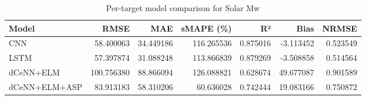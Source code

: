 \begin{table}
\caption{Per-target model comparison for Solar Mw}
\begin{tabular}{lrrrrrr}
\toprule
Model & RMSE & MAE & sMAPE (\%) & R² & Bias & NRMSE \\
\midrule
CNN & 58.400063 & 34.449186 & 116.265536 & 0.875016 & -3.113452 & 0.523549 \\
LSTM & 57.397874 & 31.088248 & 113.866839 & 0.879269 & -3.508858 & 0.514564 \\
dCeNN+ELM & 100.756380 & 88.866094 & 126.088821 & 0.628674 & 49.677087 & 0.901589 \\
dCeNN+ELM+ASP & 83.913183 & 58.310206 & 60.636028 & 0.742444 & 19.083166 & 0.750872 \\
\bottomrule
\end{tabular}
\end{table}
